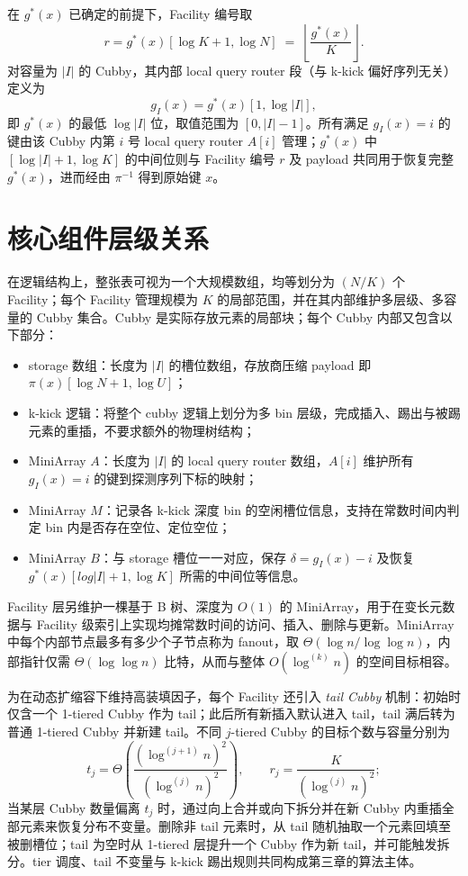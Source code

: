 在 \(g^\ast(x)\) 已确定的前提下，Facility 编号取
\[
  r=g^\ast(x)[\log K+1,\log N]
  \;=\;\left\lfloor \frac{g^\ast(x)}{K}\right\rfloor .
\]
对容量为 \(|I|\) 的 Cubby，其内部 local query router 段（与 k-kick 偏好序列无关）定义为
\[
  g_I(x)=g^\ast(x)[1,\log |I|],
\]
即 \(g^\ast(x)\) 的最低 \(\log|I|\) 位，取值范围为 \([0,|I|-1]\)。所有满足 \(g_I(x)=i\) 的键由该 Cubby 内第 \(i\) 号 local query router \(A[i]\) 管理；\(g^\ast(x)\) 中 \([{\log|I|+1},{\log K}]\) 的中间位则与 Facility 编号 \(r\) 及 payload 共同用于恢复完整 \(g^\ast(x)\)，进而经由 \(\pi^{-1}\) 得到原始键 \(x\)\cite{bender2022otsh,pagh2008retrieval}。

\section{核心组件层级关系}

在逻辑结构上，整张表可视为一个大规模数组，均等划分为 \((N/K)\) 个 Facility；每个 Facility 管理规模为 \(K\) 的局部范围，并在其内部维护多层级、多容量的 Cubby 集合。Cubby 是实际存放元素的局部块；每个 Cubby 内部又包含以下部分：
\begin{itemize}
  \item storage 数组：长度为 \(|I|\) 的槽位数组，存放商压缩 payload 即 \(\pi(x)[\log N+1,\log U]\)；
  \item k-kick 逻辑：将整个 cubby 逻辑上划分为多 bin 层级，完成插入、踢出与被踢元素的重插，不要求额外的物理树结构；
  \item MiniArray \(A\)：长度为 \(|I|\) 的 local query router 数组，\(A[i]\) 维护所有 \(g_I(x)=i\) 的键到探测序列下标的映射；
  \item MiniArray \(M\)：记录各 k-kick 深度 bin 的空闲槽位信息，支持在常数时间内判定 bin 内是否存在空位、定位空位；
  \item MiniArray \(B\)：与 storage 槽位一一对应，保存 \(\delta=g_I(x)-i\) 及恢复 \(g^\ast(x)[log|I|+1,\log K]\) 所需的中间位等信息。
\end{itemize}

Facility 层另维护一棵基于 B 树、深度为 \(O(1)\) 的 MiniArray，用于在变长元数据与 Facility 级索引上实现均摊常数时间的访问、插入、删除与更新\cite{bender2022otsh,bayer1972}。MiniArray 中每个内部节点最多有多少个子节点称为 fanout，取 \(\Theta(\log n/\log\log n)\)，内部指针仅需 \(\Theta(\log\log n)\) 比特，从而与整体 \(O(\log^{(k)}n)\) 的空间目标相容\cite{pagh2001,jacobson1989}。

为在动态扩缩容下维持高装填因子，每个 Facility 还引入 \emph{tail Cubby} 机制：初始时仅含一个 1-tiered Cubby 作为 tail；此后所有新插入默认进入 tail，tail 满后转为普通 1-tiered Cubby 并新建 tail。不同 \(j\)-tiered Cubby 的目标个数与容量分别为
\[
  t_j=\Theta\!\left(\frac{(\log^{(j+1)}n)^2}{(\log^{(j)}n)^2}\right),\qquad
  r_j=\frac{K}{(\log^{(j)}n)^2};
\]
当某层 Cubby 数量偏离 \(t_j\) 时，通过向上合并或向下拆分并在新 Cubby 内重插全部元素来恢复分布不变量。删除非 tail 元素时，从 tail 随机抽取一个元素回填至被删槽位；tail 为空时从 1-tiered 层提升一个 Cubby 作为新 tail，并可能触发拆分。tier 调度、tail 不变量与 k-kick 踢出规则共同构成第三章的算法主体\cite{bender2022otsh,bender2024sosa,conway2018,pandey2023iceberght}。

